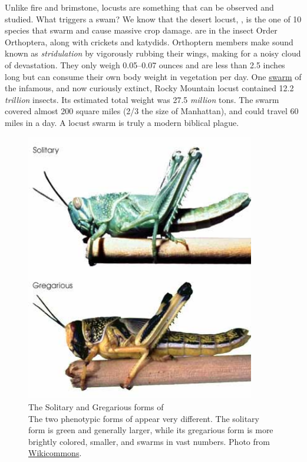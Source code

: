   Unlike fire and brimstone, locusts are something that can be observed and studied. What triggers a swam? We know that the desert locust, \locusts{}, is the one of 10 species that swarm and cause massive crop damage. \locusts{} are in the insect Order Orthoptera, along with crickets and katydids. Orthoptern members make sound known as \textit{stridulation} by vigorously rubbing their wings, making for a noisy cloud of devastation. They only weigh 0.05--0.07 ounces and are less than 2.5 inches long but can consume their own body weight in vegetation per day. One \href{http://animaldiversity.ummz.umich.edu/site/accounts/information/Melanoplus_spretus.html}{swarm} of the infamous, and now curiously extinct, Rocky Mountain locust contained 12.2 \textit{trillion} insects. Its estimated total weight was 27.5 \textit{million} tons. The swarm covered almost 200 square miles (2/3 the size of Manhattan), and could travel 60 miles in a day. A locust swarm is truly a modern biblical plague.

  \begin{figure} %
    \centering 
    \includegraphics[width=10cm,keepaspectratio]{Figures/Intro/DesertLocust.jpeg}
    \caption[The Solitary and Gregarious forms of \locusts{}]
    {
      The Solitary and Gregarious forms of \locusts{}\\[0.25cm]
      The two phenotypic forms of \locusts{} appear very different. The solitary form is green and generally larger, while its gregarious form is more brightly colored, smaller, and swarms in vast numbers. Photo from \href{http://www.wikicommons.com}{Wikicommons}.
      }
    \label{Intro:fig:Locust}
    \end{figure}

